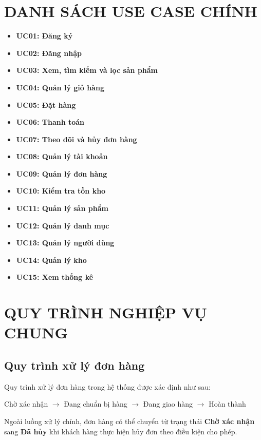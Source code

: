 \documentclass[12pt,a4paper]{article}
\begin{document}
\section{DANH SÁCH USE CASE CHÍNH}

\begin{itemize}
    \item \textbf{UC01: Đăng ký}
    \item \textbf{UC02: Đăng nhập}
    \item \textbf{UC03: Xem, tìm kiếm và lọc sản phẩm}
    \item \textbf{UC04: Quản lý giỏ hàng}
    \item \textbf{UC05: Đặt hàng}
    \item \textbf{UC06: Thanh toán}
    \item \textbf{UC07: Theo dõi và hủy đơn hàng}
    \item \textbf{UC08: Quản lý tài khoản}
    \item \textbf{UC09: Quản lý đơn hàng}
    \item \textbf{UC10: Kiểm tra tồn kho}
    \item \textbf{UC11: Quản lý sản phẩm}
    \item \textbf{UC12: Quản lý danh mục}
    \item \textbf{UC13: Quản lý người dùng}
    \item \textbf{UC14: Quản lý kho}
    \item \textbf{UC15: Xem thống kê}
\end{itemize}

\section{QUY TRÌNH NGHIỆP VỤ CHUNG}

\subsection*{Quy trình xử lý đơn hàng}

Quy trình xử lý đơn hàng trong hệ thống được xác định như sau:

\begin{center}
Chờ xác nhận $\rightarrow$ Đang chuẩn bị hàng $\rightarrow$ Đang giao hàng $\rightarrow$ Hoàn thành
\end{center}

Ngoài luồng xử lý chính, đơn hàng có thể chuyển từ trạng thái \textbf{Chờ xác nhận} sang \textbf{Đã hủy} khi khách hàng thực hiện hủy đơn theo điều kiện cho phép.
\end{document}
